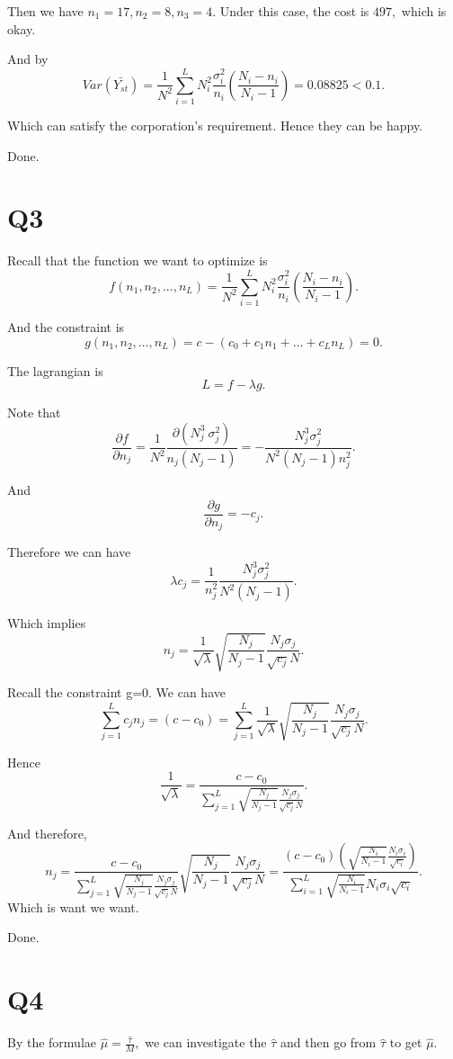 \documentclass[12pt]{article}%
\begin{document}
Then we have $n_1=17, n_2=8, n_3=4.$ Under this case, the cost is $497,$ which is okay. 

And by $$Var(\bar{Y_{st}})=\frac{1}{N^2}\sum_{i=1}^{L}N_i^2\frac{\sigma_i^2}{n_i}(\frac{N_i-n_i}{N_i-1})=0.08825<0.1.$$

Which can satisfy the corporation's requirement. Hence they can be happy.

Done. 

\section{Q3}
Recall that the function we want to optimize is $$f(n_1,n_2,...,n_L)=\frac{1}{N^2}\sum_{i=1}^{L}N_i^2\frac{\sigma_{i}^2}{n_i}(\frac{N_i-n_i}{N_i-1}).$$

And the constraint is $$g(n_1,n_2,...,n_L)=c-(c_0+c_1n_1+...+c_Ln_L)=0.$$

The lagrangian is $$L=f-\lambda g.$$ 

Note that $$\frac{\partial f}{\partial n_j}=\frac{1}{N^2}\frac{\partial (N_j^3\ \sigma_{j}^2)}{n_j (N_j-1)}=-\frac{N_j^3 \sigma_j^2}{N^2 (N_j-1)n_j^2}.$$

And $$\frac{\partial g}{\partial n_j}=-c_j.$$ 

Therefore we can have $$\lambda c_j = \frac{1}{n_j^2}\frac{N_j^3 \sigma_j^2}{N^2(N_j-1)}.$$ 

Which implies $$n_j=\frac{1}{\sqrt{\lambda}} \sqrt{\frac{N_j}{N_j -1}} \frac{N_j \sigma_j}{\sqrt{c_j} N}.$$

Recall the constraint g=0. We can have $$\sum_{j=1}^{L}c_jn_j=(c-c_0)=\sum_{j=1}^{L} \frac{1}{\sqrt{\lambda}} \sqrt{\frac{N_j}{N_j -1}} \frac{N_j \sigma_j}{\sqrt{c_j} N}.$$

Hence $$\frac{1}{\sqrt{\lambda}}=\frac{c-c_0}{\sum_{j=1}^{L}\sqrt{\frac{N_j}{N_j -1}} \frac{N_j \sigma_j}{\sqrt{c_j} N} } .$$

And therefore, $$n_j=\frac{c-c_0}{\sum_{j=1}^{L}\sqrt{\frac{N_j}{N_j -1}} \frac{N_j \sigma_j}{\sqrt{c_j} N} } \sqrt{\frac{N_j}{N_j -1}} \frac{N_j \sigma_j}{\sqrt{c_j} N}=\frac{(c-c_0)(\sqrt{\frac{N_i}{N_i-1}}\frac{N_i \sigma_i}{\sqrt{c_i}})}{\sum_{i=1}^{L} \sqrt{\frac{N_i}{N_i-1}}N_i \sigma_i \sqrt{c_i} }.$$ Which is want we want. 

Done.

\section{Q4}
By the formulae $\hat{\mu} = \frac{\hat{\tau}}{M},$ we can investigate the $\hat{\tau}$ and then go from $\hat{\tau}$ to get $\hat{\mu}.$
\end{document}
